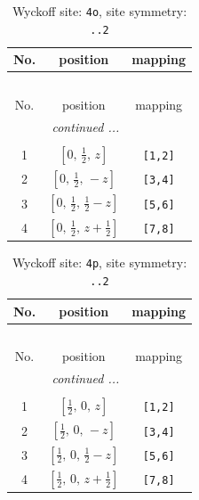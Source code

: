 \documentclass[fleqn,8pt]{jsarticle}
\begin{document}
\renewcommand{\arraystretch}{1.2}
\begin{longtable}{ccc}
\caption{Wyckoff site: {\tt 4o}, site symmetry: {\tt ..2}}
 \\
 \hline \hline
No. & position & mapping \\ \hline \endfirsthead

\multicolumn{2}{l}{\tablename\ \thetable{}} \\
 \hline \hline
No. & position & mapping \\ \hline \endhead

 \hline \hline
\multicolumn{2}{r}{\footnotesize\it continued ...} \\ \endfoot

 \hline \hline
\multicolumn{2}{r}{} \\ \endlastfoot

1 & $\left[ 0,\, \frac{1}{2},\, z \right]$ & {\tt [1,2]} \\ \hline
2 & $\left[ 0,\, \frac{1}{2},\, - z \right]$ & {\tt [3,4]} \\ \hline
3 & $\left[ 0,\, \frac{1}{2},\, \frac{1}{2} - z \right]$ & {\tt [5,6]} \\ \hline
4 & $\left[ 0,\, \frac{1}{2},\, z + \frac{1}{2} \right]$ & {\tt [7,8]} \\
\end{longtable}
\renewcommand{\arraystretch}{1.2}
\begin{longtable}{ccc}
\caption{Wyckoff site: {\tt 4p}, site symmetry: {\tt ..2}}
 \\
 \hline \hline
No. & position & mapping \\ \hline \endfirsthead

\multicolumn{2}{l}{\tablename\ \thetable{}} \\
 \hline \hline
No. & position & mapping \\ \hline \endhead

 \hline \hline
\multicolumn{2}{r}{\footnotesize\it continued ...} \\ \endfoot

 \hline \hline
\multicolumn{2}{r}{} \\ \endlastfoot

1 & $\left[ \frac{1}{2},\, 0,\, z \right]$ & {\tt [1,2]} \\ \hline
2 & $\left[ \frac{1}{2},\, 0,\, - z \right]$ & {\tt [3,4]} \\ \hline
3 & $\left[ \frac{1}{2},\, 0,\, \frac{1}{2} - z \right]$ & {\tt [5,6]} \\ \hline
4 & $\left[ \frac{1}{2},\, 0,\, z + \frac{1}{2} \right]$ & {\tt [7,8]} \\
\end{longtable}
\end{document}
